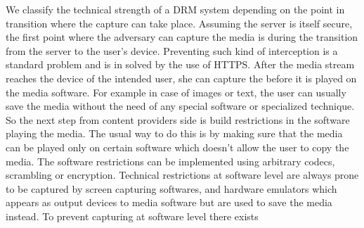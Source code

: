 We classify the technical strength of a DRM system depending on the
point in transition where the capture can take place. Assuming the
server is itself secure, the first point where the adversary can capture
the media is during the transition from the server to the user's device.
Preventing such kind of interception is a standard problem and is in
solved by the use of HTTPS. After the media stream reaches the device of
the intended user, she can capture the before it is played on the media
software. For example in case of images or text, the user can usually
save the media without the need of any special software or specialized
technique. So the next step from content providers side is build
restrictions in the software playing the media. The usual way to do this
is by making sure that the media can be played only on certain software
which doesn't allow the user to copy the media. The software
restrictions can be implemented using arbitrary codecs, scrambling or
encryption. Technical restrictions at software level are always prone to
be captured by screen capturing softwares, and hardware emulators which
appears as output devices to media software but are used to save the
media instead. To prevent capturing at software level there exists
